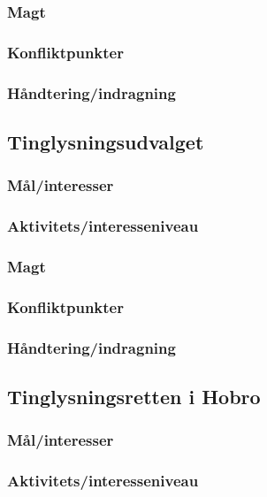 \documentclass[10pt,a4paper,danish]{article}
\begin{document}
\subsubsection{Magt}

\subsubsection{Konfliktpunkter}

\subsubsection{Håndtering/indragning}


\subsection{Tinglysningsudvalget}
\subsubsection{Mål/interesser}

\subsubsection{Aktivitets/interesseniveau}

\subsubsection{Magt}

\subsubsection{Konfliktpunkter}

\subsubsection{Håndtering/indragning}


\subsection{Tinglysningsretten i Hobro}
\subsubsection{Mål/interesser}

\subsubsection{Aktivitets/interesseniveau}
\end{document}
